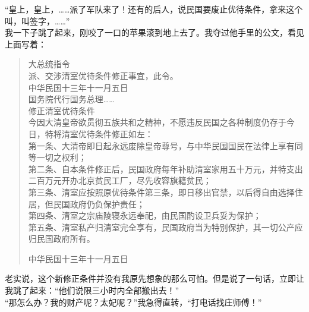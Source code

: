 “皇上，皇上，……派了军队来了！还有的后人，说民国要废止优待条件，拿来这个叫，叫签字，……”\\

我一下子跳了起来，刚咬了一口的苹果滚到地上去了。我夺过他手里的公文，看见上面写着：\\

\begin{quote}
	大总统指令\\

派、交涉清室优待条件修正事宜，此令。\\

中华民国十三年十一月五日\\

国务院代行国务总理……\\

修正清室优待条件\\

今因大清皇帝欲贯彻五族共和之精神，不愿违反民国之各种制度仍存于今日，特将清室优待条件修正如左：\\

第一条、大清帝即日起永远废除皇帝尊号，与中华民国国民在法律上享有同等一切之权利；\\

第二条、自本条件修正后，民国政府每年补助清室家用五十万元，并特支出二百万元开办北京贫民工厂，尽先收容旗籍贫民；\\

第三条、清室应按照原优待条件第三条，即日移出官禁，以后得自由选择住居，但民国政府仍负保护责任；\\

第四条、清室之宗庙陵寝永远奉祀，由民国酌设卫兵妥为保护；\\

第五条、清室私产归清室完全享有，民国政府当为特别保护，其一切公产应归民国政府所有。\\

\begin{flushright}
	中华民国十三年十一月五日
\end{flushright}
\end{quote}

老实说，这个新修正条件并没有我原先想象的那么可怕。但是说了一句话，立即让我跳了起来：“他们说限三小时内全部搬出去！”\\

“那怎么办？我的财产呢？太妃呢？”我急得直转，“打电话找庄师傅！”\\

